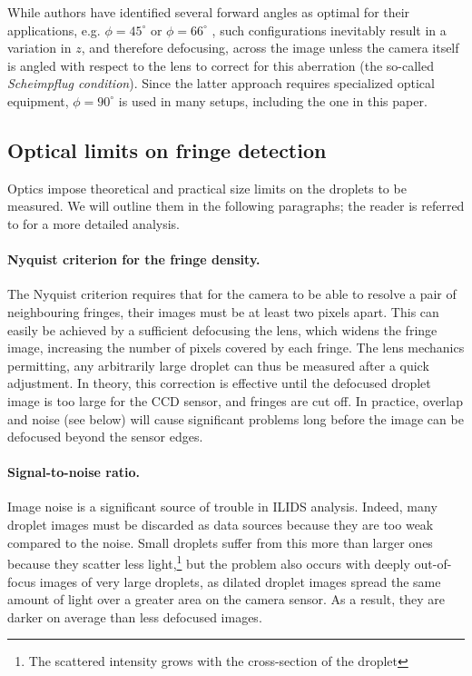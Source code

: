 \documentclass[11.5pt,oneside]{book}
\begin{document}
While authors have identified several forward angles as optimal for their
applications, e.g. $\phi = 45^\circ$ \cite{Glover95} or $\phi = 66^\circ$
\cite{Mounaim99}, such configurations inevitably result in a variation in $z$,
and therefore defocusing, across the image unless the
camera itself is angled with respect to the lens to correct for this aberration
(the so-called \emph{Scheimpflug condition}). Since the latter approach requires
specialized optical equipment, $\phi = 90^\circ$ is used in many setups,
including the one in this paper.

\subsection{Optical limits on fringe detection}
\label{sec:ipi-fringelimits}
Optics impose theoretical and practical size limits on the droplets to be
measured. We will outline them in the following paragraphs; the reader is
referred to \citet{Damaschke02} for a more detailed analysis.

\paragraph{Nyquist criterion for the fringe density.}
The Nyquist criterion requires that for the camera to be able to resolve a pair
of neighbouring fringes, their images must be at least two pixels apart. This
can easily be achieved by a sufficient defocusing the lens, which widens the
fringe image, increasing the number of pixels covered by each fringe. The lens
mechanics permitting, any arbitrarily large droplet can thus be measured after a
quick adjustment. In theory, this correction is effective until the defocused
droplet image is too large for the CCD sensor, and fringes are cut off. In
practice, overlap and noise (see below) will cause significant problems long
before the image can be defocused beyond the sensor edges.

\paragraph{Signal-to-noise ratio.}
Image noise is a significant source of trouble in ILIDS analysis. Indeed, many
droplet images must be discarded as data sources because they are too weak
compared to the noise.
Small droplets suffer from this more than larger ones because they scatter less
light,\footnote{The scattered intensity grows with the cross-section of the
droplet} but the problem also occurs with deeply out-of-focus images of very large
droplets, as dilated droplet images spread the same amount of light over a
greater area on the camera sensor. As a result, they are darker on average than
less defocused images. 
\end{document}
